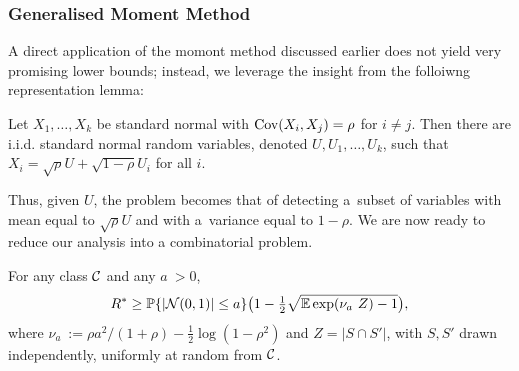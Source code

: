 \documentclass[10pt, oneside]{article}
\begin{document}
\subsubsection{Generalised Moment Method}
A direct application of the momont method discussed earlier does not yield very promising lower bounds; instead, we leverage the insight from the folloiwng representation lemma:
\begin{lem}
  \label{lemrepresent}
  Let $X_1,\ldots, X_k$ be standard normal with $\operatorname{Cov}(X_i, X_j) = \rho
  $ for $i \neq j$. Then there are i.i.d. standard normal random
  variables, denoted $U, U_1,\ldots, U_k$, such that $X_i = \sqrt{\rho}
  U + \sqrt{1-\rho}   U_i$ for all $i$.
\end{lem}
Thus, given $U$, the problem becomes that of detecting a~subset of
variables with mean equal to $\sqrt{\rho} U$ and with a~variance equal to $1-\rho$. We are now ready to reduce our analysis into a combinatorial problem.

\begin{prop}
  \label{thmlower}
For any class ${\mathcal C}$ and any $a~> 0$,
\[
R^* \geq\mathbb{P}\{|{\mathcal N}(0,1)| \le a\} \bigl(1 - \tfrac12 \sqrt{\mathbb{E}
\exp
(\nu_a~Z ) - 1}\bigr),
\]
where $\nu_a~:= \rho a^2/(1+\rho)- \frac12 \log(1-\rho^2)$ and
$Z=|S \cap S'|$, with $S, S'$ drawn independently, uniformly at random
from ${\mathcal C}$.
\end{prop}
\end{document}
